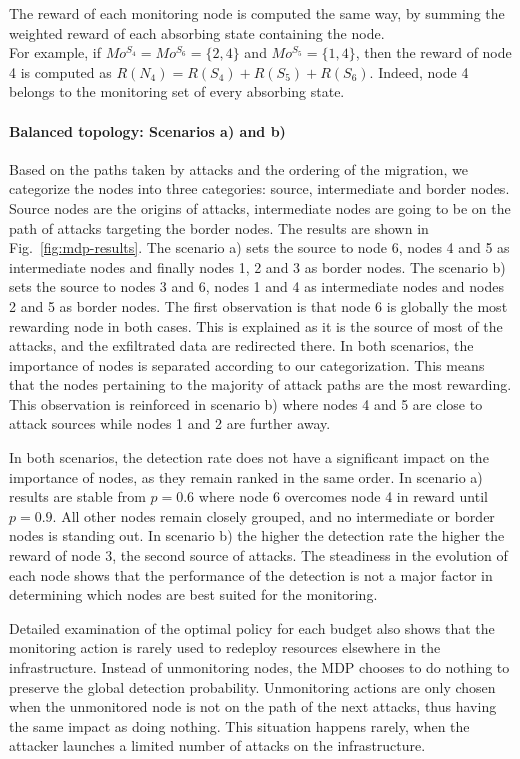 The reward of each monitoring node is computed the same way, by summing the weighted reward of each absorbing state containing the node.\\
For example, if $Mo^{S_4} = Mo^{S_6} =\{2,4\}$ and $Mo^{S_5} = \{1,4\}$, then the reward of node 4 is computed as $R(N_4) = R(S_4) + R(S_5) + R(S_6)$. Indeed, node 4 belongs to the monitoring set of every absorbing state.



\paragraph{Balanced topology: Scenarios a) and b)}
Based on the paths taken by attacks and the ordering of the migration, we categorize the nodes into three categories: source, intermediate and border nodes. Source nodes are the origins of attacks, intermediate nodes are going to be on the path of attacks targeting the border nodes. 
The results are shown in Fig.~\ref{fig:mdp-results}.
The scenario a) sets the source to node 6, nodes 4 and 5 as intermediate nodes and finally nodes 1, 2 and 3 as border nodes.
The scenario b) sets the source to nodes 3 and 6, nodes 1 and 4 as intermediate nodes and nodes 2 and 5 as border nodes.
The first observation is that node 6 is globally the most rewarding node in both cases.
This is explained as it is the source of most of the attacks, and the exfiltrated data are redirected there.
In both scenarios, the importance of nodes is separated according to our categorization. 
This means that the nodes pertaining to the majority of attack paths are the most rewarding.
This observation is reinforced in scenario b) where nodes 4 and 5 are close to attack sources while nodes 1 and 2 are further away.

In both scenarios, the detection rate does not have a significant impact on the importance of nodes, as they remain ranked in the same order.
In scenario a) results are stable from $p=0.6$ where node 6 overcomes node 4 in reward until $p=0.9$. All other nodes remain closely grouped, and no intermediate or border nodes is standing out.
In scenario b) the higher the detection rate the higher the reward of node 3, the second source of attacks.
The steadiness in the evolution of each node shows that the performance of the detection is not a major factor in determining which nodes are best suited for the monitoring. 

Detailed examination of the optimal policy for each budget also shows that the monitoring action is rarely used to redeploy resources elsewhere in the infrastructure.
Instead of unmonitoring nodes, the MDP chooses to do nothing to preserve the global detection probability.
Unmonitoring actions are only chosen when the unmonitored node is not on the path of the next attacks, thus having the same impact as doing nothing. 
This situation happens rarely, when the attacker launches a limited number of attacks on the infrastructure.


